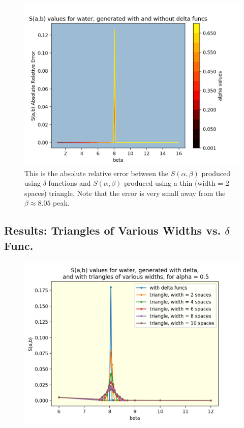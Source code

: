\documentclass[10pt]{article}
\begin{document}
            \begin{figure}[H]
              \begin{center}
              \includegraphics[scale=0.6]{sab_thinTriangle_error}
                \caption{This is the absolute relative error between the $S(\alpha,\beta)$ produced using $\delta$ functions and $S(\alpha,\beta)$ produced using a thin (width = 2 spaces) triangle. Note that the error is very small away from the $\beta\approx8.05$ peak. }
              \label{fig:sabThinTriangleError}
              \end{center}
            \end{figure}




\subsection*{Results: Triangles of Various Widths vs. $\delta$ Func.}

            \begin{figure}[H]
              \begin{center}
              \includegraphics[scale=0.6]{diff_widths_alpha_0p5}
                \caption{}
              \label{fig:diff_widths_alpha_0p5}
              \end{center}
            \end{figure}
\end{document}
